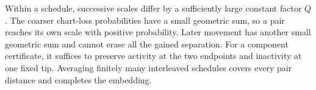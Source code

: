 Within a schedule, successive scales differ by a sufficiently large
constant factor $Q$. The coarser chart-loss probabilities have a
small geometric sum, so a pair reaches its own scale with positive
probability. Later movement has another small geometric sum and
cannot erase all the gained separation. For a component certificate,
it suffices to preserve activity at the two endpoints and inactivity
at one fixed tip. Averaging finitely many interleaved schedules
covers every pair distance and completes the embedding.
